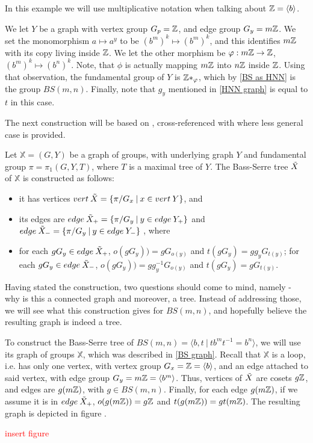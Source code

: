 \begin{importantexample} \label{BS graph} In this example we will use multiplicative notation when talking about $\mathbb{Z} = \langle b \rangle$. 

We let $Y$ be a graph with vertex group $G_p = \mathbb{Z}$, and edge group $G_y = m\mathbb{Z}$. We set the monomorphism $a \mapsto a^y$ to be $(b^m)^k \mapsto (b^m)^k$, and this identifies $m\mathbb{Z}$ with its copy living inside $\mathbb{Z}$. We let the other morphism be $\varphi: m\mathbb{Z} \to \mathbb{Z}$, $(b^m)^k \mapsto (b^n)^k$. Note, that $\phi$ is actually mapping $m\mathbb{Z}$ into $n\mathbb{Z}$ inside $\mathbb{Z}$. Using that observation, the fundamental group of $Y$ is $\mathbb{Z} \ast _\varphi$, which by \ref{BS as HNN} is the group $BS(m,n)$. Finally, note that $g_y$ mentioned in \ref{HNN graph} is equal to $t$ in this case.
\end{importantexample}

The next construction will be based on \cite[pages 23-24]{GoPaXi24}, cross-referenced with \cite{BajoHNN} where less general case is provided.

\begin{construction}
    Let $\mathbb{X} = (G,Y)$ be a graph of groups, with underlying graph $Y$ and fundamental group $\pi = \pi_1(G,Y,T)$, where $T$ is a maximal tree of $Y$.
    The Bass-Serre tree $\Tilde{X}$ of $\mathbb{X}$ is constructed as follows:
    \begin{itemize}
        \item it has vertices $vert \: \Tilde{X} = \{\pi/G_x\:|\: x \in vert\:Y\}$, and
        \item its edges are $edge \: \Tilde{X}_+ = \{\pi/G_y \: | \: y \in edge \:Y_+ \}$ and $edge \: \Tilde{X}_- = \{\pi/G_y \: | \: y \in edge \:Y_- \}$ , where
        \item for each $gG_y \in edge \: \Tilde{X}_+$, $o(gG_y)) = gG_{o(y)}$ and $t(gG_y) = gg_yG_{t(y)}$; for each $gG_y \in edge \: \Tilde{X}_-$, $o(gG_y)) = gg_y^{-1}G_{o(y)}$ and $t(gG_y) = gG_{t(y)}$.
    \end{itemize}
\end{construction}

Having stated the construction, two questions should come to mind, namely - why is this a connected graph and moreover, a tree. Instead of addressing those, we will see what this construction gives for $BS(m,n)$, and hopefully believe the resulting graph is indeed a tree.

\begin{example}
    To construct the Bass-Serre tree of $BS(m,n) = \langle b,t \: | \: tb^mt^{-1} = b^n \rangle$, we will use its graph of groups $\mathbb{X}$, which was described in \ref{BS graph}. Recall that $\mathbb{X}$ is a loop, i.e. has only one vertex, with vertex group $G_x = \mathbb{Z} = \langle b\rangle$, and an edge attached to said vertex, with edge group $G_y = m\mathbb{Z} = \langle b^m \rangle$. Thus, vertices of $\Tilde{X}$ are cosets $g\mathbb{Z}$, and edges are $g(m\mathbb{Z})$, with $g \in BS(m,n)$. Finally, for each edge $g(m\mathbb{Z})$, if we assume it is in $edge \: \Tilde{X}_+$, $o(g(m\mathbb{Z})) = g\mathbb{Z}$ and $t(g(m\mathbb{Z})) = gt(m\mathbb{Z})$.
    The resulting graph is depicted in figure .
\end{example}

\textcolor{red}{insert figure}


